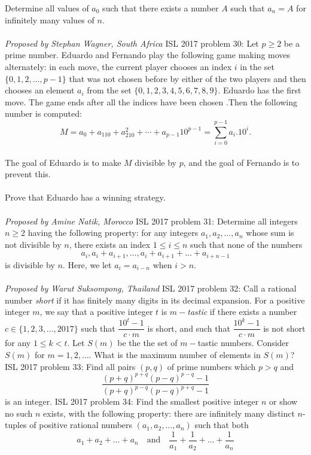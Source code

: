Determine all values of $a_0$ such that there exists a number $A$ such that $a_n = A$ for infinitely many values of $n$. \\\\
\textit{Proposed by Stephan Wagner, South Africa} 
ISL 2017 problem 30:  Let $ p \geq 2$ be a prime number. Eduardo and Fernando play the following game making moves alternately: in each move, the current player chooses an index $i$ in the set $\{0,1,2,\ldots, p-1 \}$ that was not chosen before by either of the two players and then chooses an element $a_i$ from the set $\{0,1,2,3,4,5,6,7,8,9\}$. Eduardo has the first move. The game ends after all the indices have been chosen .Then the following number is computed:
\[ M=a_0+a_110+a_210^2+\cdots+a_{p-1}10^{p-1}= \sum_{i=0}^{p-1}a_i.10^i .\] \\
The goal of Eduardo is to make  $M$ divisible by $p$, and the goal of Fernando is to prevent this. \\\\
Prove that Eduardo has a winning strategy. \\\\
\textit{Proposed by Amine Natik, Morocco} 
ISL 2017 problem 31:  Determine all integers $ n\geq 2$ having the following property: for any integers $a_1,a_2,\ldots, a_n$ whose sum is not divisible by $n$, there exists an index $1 \leq i \leq n$ such that none of the numbers
\[ a_i,a_i+a_{i+1},\ldots,a_i+a_{i+1}+\ldots+a_{i+n-1} \]
is divisible by $n$. Here, we let $a_i=a_{i-n}$ when $i >n$. \\\\
\textit{Proposed by Warut Suksompong, Thailand} 
ISL 2017 problem 32:  Call a rational number \textit{short} if it has finitely many digits in its decimal expansion. For a positive integer $m$, we say that a positive integer $t$ is $m-$\textit{tastic} if there exists a number $c\in \{1,2,3,\ldots ,2017\}$ such that $\dfrac{10^t-1}{c\cdot m}$ is short, and such that $\dfrac{10^k-1}{c\cdot m}$ is not short for any $1\le k<t$. Let $S(m)$ be the the set of $m-$tastic numbers. Consider $S(m)$ for $m=1,2,\ldots{}.$ What is the maximum number of elements in $S(m)$? 
ISL 2017 problem 33:  Find all pairs $(p,q)$ of prime numbers which $p>q$ and
\[ \frac{(p+q)^{p+q}(p-q)^{p-q}-1}{(p+q)^{p-q}(p-q)^{p+q}-1} \]
is an integer. 
ISL 2017 problem 34:  Find the smallest positive integer $n$ or show no such $n$ exists, with the following property: there are infinitely many distinct $n$-tuples of positive rational numbers $(a_1, a_2, \ldots, a_n)$ such that both
\[
a_1+a_2+\dots +a_n \quad \text{and} \quad \frac{1}{a_1} + \frac{1}{a_2} + \dots + \frac{1}{a_n}
\]
